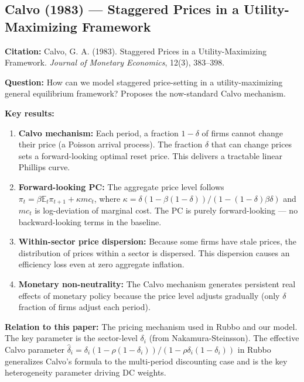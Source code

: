 \documentclass[12pt]{article}
\begin{document}
\subsection{Calvo (1983) --- Staggered Prices in a Utility-Maximizing Framework}

\textbf{Citation:} Calvo, G. A. (1983). Staggered Prices in a Utility-Maximizing Framework. \textit{Journal of Monetary Economics}, 12(3), 383--398.

\textbf{Question:} How can we model staggered price-setting in a utility-maximizing general equilibrium framework? Proposes the now-standard Calvo mechanism.

\textbf{Key results:}
\begin{enumerate}
    \item \textbf{Calvo mechanism:} Each period, a fraction $1-\delta$ of firms cannot change their price (a Poisson arrival process). The fraction $\delta$ that can change prices sets a forward-looking optimal reset price. This delivers a tractable linear Phillips curve.
    \item \textbf{Forward-looking PC:} The aggregate price level follows $\pi_t = \beta\mathbb{E}_t\pi_{t+1} + \kappa mc_t$, where $\kappa = \delta(1-\beta(1-\delta))/(1-(1-\delta)\beta\delta)$ and $mc_t$ is log-deviation of marginal cost. The PC is purely forward-looking --- no backward-looking terms in the baseline.
    \item \textbf{Within-sector price dispersion:} Because some firms have stale prices, the distribution of prices within a sector is dispersed. This dispersion causes an efficiency loss even at zero aggregate inflation.
    \item \textbf{Monetary non-neutrality:} The Calvo mechanism generates persistent real effects of monetary policy because the price level adjusts gradually (only $\delta$ fraction of firms adjust each period).
\end{enumerate}

\textbf{Relation to this paper:} The pricing mechanism used in Rubbo and our model. The key parameter is the sector-level $\delta_i$ (from Nakamura-Steinsson). The effective Calvo parameter $\hat{\delta}_i = \delta_i(1-\rho(1-\delta_i))/(1-\rho\delta_i(1-\delta_i))$ in Rubbo generalizes Calvo's formula to the multi-period discounting case and is the key heterogeneity parameter driving DC weights.

\end{document}
